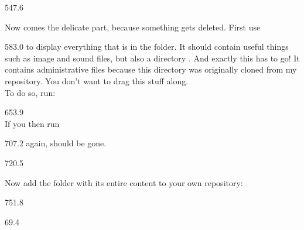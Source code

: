 \documentclass{aslab}
\begin{document}
\begin{region}[pitch=17.8]{547.6}
\begin{tasks}[start=4]
\item Now comes the delicate part, because something gets deleted. First
  use\\
\end{tasks}
\end{region}

\begin{region}[x=74.7,right=0,pitch=13.25]{583.0}
to display everything that is in the folder. It should contain useful things
such as image and sound files, but also a directory . And exactly
this  has to go! It contains administrative files because this
directory was originally cloned from my repository. You don't want to drag
this stuff along.\\
To do so, run:
\end{region}

\begin{region}[x=74.7,right=0,pitch=17.7]{653.9}
\\
If you then run\\
\end{region}

\begin{region}[x=74.7,right=0]{707.2}
again,  should be gone.
\end{region}

\begin{region}[pitch=17.8]{720.5}
\begin{tasks}[start=5]
\item Now add the folder with its entire content to your own repository:\\
\end{tasks}
\end{region}

\begin{region}[x=74.7,right=0,pitch=13.5]{751.8}
\\
\end{region}

\nextpage
\begin{region}{69.4}
\end{region}
\end{document}
